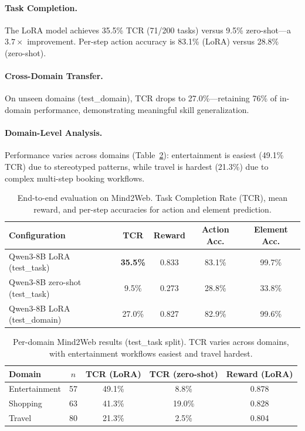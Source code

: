 \documentclass{article}
\begin{document}
\paragraph{Task Completion.} The LoRA model achieves 35.5\% TCR (71/200 tasks) versus 9.5\% zero-shot---a $3.7\times$ improvement. Per-step action accuracy is 83.1\% (LoRA) versus 28.8\% (zero-shot).

\paragraph{Cross-Domain Transfer.} On unseen domains (test\_domain), TCR drops to 27.0\%---retaining 76\% of in-domain performance, demonstrating meaningful skill generalization.

\paragraph{Domain-Level Analysis.} Performance varies across domains (Table~\ref{tab:e2e_domain}): entertainment is easiest (49.1\% TCR) due to stereotyped patterns, while travel is hardest (21.3\%) due to complex multi-step booking workflows.

\begin{table}[h]
\centering
\caption{End-to-end evaluation on Mind2Web. Task Completion Rate (TCR), mean reward, and per-step accuracies for action and element prediction.}
\label{tab:e2e}
\small
\begin{tabular}{lcccc}
\toprule
\textbf{Configuration} & \textbf{TCR} & \textbf{Reward} & \textbf{Action Acc.} & \textbf{Element Acc.} \\
\midrule
Qwen3-8B LoRA (test\_task) & \textbf{35.5\%} & 0.833 & 83.1\% & 99.7\% \\
Qwen3-8B zero-shot (test\_task) & 9.5\% & 0.273 & 28.8\% & 33.8\% \\
Qwen3-8B LoRA (test\_domain) & 27.0\% & 0.827 & 82.9\% & 99.6\% \\
\bottomrule
\end{tabular}
\end{table}

\begin{table}[h]
\centering
\caption{Per-domain Mind2Web results (test\_task split). TCR varies across domains, with entertainment workflows easiest and travel hardest.}
\label{tab:e2e_domain}
\small
\begin{tabular}{lcccc}
\toprule
\textbf{Domain} & \textbf{$n$} & \textbf{TCR (LoRA)} & \textbf{TCR (zero-shot)} & \textbf{Reward (LoRA)} \\
\midrule
Entertainment & 57 & 49.1\% & 8.8\% & 0.878 \\
Shopping & 63 & 41.3\% & 19.0\% & 0.828 \\
Travel & 80 & 21.3\% & 2.5\% & 0.804 \\
\bottomrule
\end{tabular}
\end{table}
\end{document}
